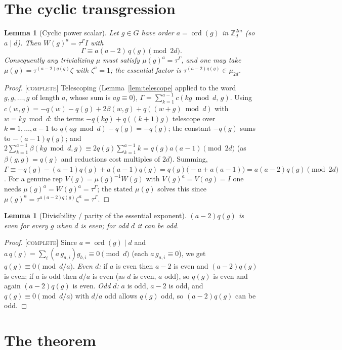 \documentclass[11pt]{article}
\newtheorem{lemma}[theorem]{Lemma}
\theoremstyle{definition}
\theoremstyle{remark}
\newcommand{\Z}{\mathbb{Z}}
\newcommand{\Zd}{\Z_d}
\DeclareMathOperator{\ord}{ord}
\newcommand{\CO}{\textnormal{\textsc{[complete]}}}
\begin{document}
\section{The cyclic transgression}\label{sec:transgression}

\begin{lemma}[Cyclic power scalar]\label{lem:cyclic}
Let $g\in G$ have order $a=\ord(g)$ in $\Zd^{2m}$ (so $a\mid d$). Then
$W(g)^a=\tau^{\Gamma}I$ with
\[
\Gamma\equiv a(a-2)\,q(g)\pmod{2d}.
\]
Consequently any trivializing $\mu$ must satisfy $\mu(g)^a=\tau^{\Gamma}$, and one may take
$\mu(g)=\tau^{(a-2)q(g)}\zeta$ with $\zeta^a=1$; the essential factor is $\tau^{(a-2)q(g)}\in\mu_{2d}$.
\end{lemma}
\begin{proof}
\CO{} Telescoping (Lemma~\ref{lem:telescope} applied to the word $g,g,\dots,g$ of length $a$, whose
sum is $a g\equiv0$),
$\Gamma=\sum_{k=1}^{a-1}c(kg\bmod d,\,g)$. Using
$c(w,g)=-q(w)-q(g)+2\beta(w,g)+q((w+g)\bmod d)$ with $w=kg\bmod d$: the terms $-q(kg)+q((k{+}1)g)$
telescope over $k=1,\dots,a-1$ to $q(ag\bmod d)-q(g)=-q(g)$; the constant $-q(g)$ sums to
$-(a-1)q(g)$; and $2\sum_{k=1}^{a-1}\beta(kg\bmod d,g)\equiv2q(g)\sum_{k=1}^{a-1}k=q(g)a(a-1)\pmod{2d}$
(as $\beta(g,g)=q(g)$ and reductions cost multiples of $2d$). Summing,
$\Gamma\equiv-q(g)-(a-1)q(g)+a(a-1)q(g)=q(g)\bigl(-a+a(a-1)\bigr)=a(a-2)q(g)\pmod{2d}$. For a genuine
rep $V(g)=\mu(g)^{-1}W(g)$ with $V(g)^a=V(ag)=I$ one needs $\mu(g)^a=W(g)^a=\tau^{\Gamma}$; the stated
$\mu(g)$ solves this since $\mu(g)^a=\tau^{a(a-2)q(g)}\zeta^a=\tau^{\Gamma}$.
\end{proof}

\begin{lemma}[Divisibility / parity of the essential exponent]\label{lem:transgression}
$(a-2)q(g)$ is \emph{even} for every $g$ when $d$ is even; for odd $d$ it can be odd.
\end{lemma}
\begin{proof}
\CO{} Since $a=\ord(g)\mid d$ and $a\,q(g)=\sum_i(a\,g_{a,i})g_{b,i}\equiv0\pmod d$ (each $a\,g_{a,i}
\equiv0$), we get $q(g)\equiv0\pmod{d/a}$. \emph{Even $d$:} if $a$ is even then $a-2$ is even and
$(a-2)q(g)$ is even; if $a$ is odd then $d/a$ is even (as $d$ is even, $a$ odd), so $q(g)$ is even and
again $(a-2)q(g)$ is even. \emph{Odd $d$:} $a$ is odd, $a-2$ is odd, and $q(g)\equiv0\pmod{d/a}$ with
$d/a$ odd allows $q(g)$ odd, so $(a-2)q(g)$ can be odd.
\end{proof}

\section{The theorem}\label{sec:localthm}
\end{document}
